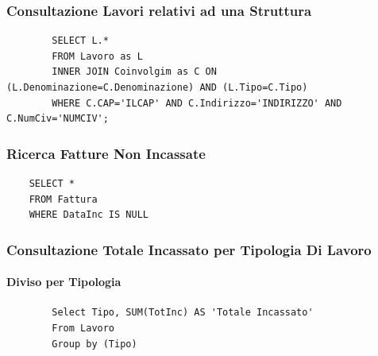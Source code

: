 \documentclass{elegantbook}
\begin{document}
\subsubsection{Consultazione Lavori relativi ad una Struttura}
	\begin{verbatim}
		SELECT L.*
		FROM Lavoro as L 
		INNER JOIN Coinvolgim as C ON (L.Denominazione=C.Denominazione) AND (L.Tipo=C.Tipo)
		WHERE C.CAP='ILCAP' AND C.Indirizzo='INDIRIZZO' AND C.NumCiv='NUMCIV';
	\end{verbatim}
\subsubsection{Ricerca Fatture Non Incassate}
\begin{verbatim}
	SELECT *
	FROM Fattura
	WHERE DataInc IS NULL
\end{verbatim}
\subsubsection{Consultazione Totale Incassato per Tipologia Di Lavoro}
\paragraph{Diviso per Tipologia}
	\begin{verbatim}
		Select Tipo, SUM(TotInc) AS 'Totale Incassato'
		From Lavoro
		Group by (Tipo)
	\end{verbatim}
\begin{figure}[H]
	\centering
\end{figure}
\end{document}
